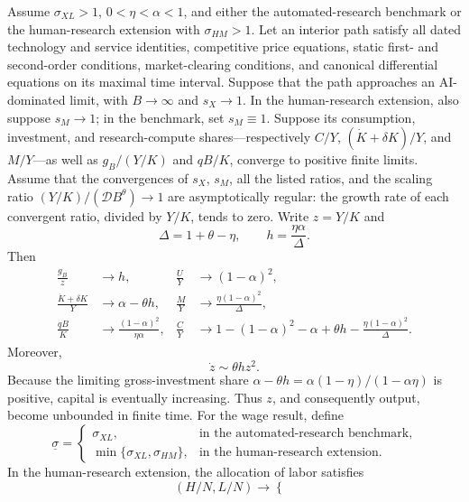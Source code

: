 \begin{conditionalresult}
\label{prop:axm-singular-limit}
Assume \(\sigma_{XL}>1\), \(0<\eta<\alpha<1\), and either the
automated-research benchmark or the human-research extension with
\(\sigma_{HM}>1\). Let an interior path satisfy all dated technology and service
identities, competitive price equations, static first- and second-order
conditions, market-clearing conditions, and canonical differential equations
on its maximal time interval. Suppose that the path approaches an AI-dominated
limit, with \(B\to\infty\) and \(s_X\to1\). In the human-research extension,
also suppose \(s_M\to1\); in the benchmark, set \(s_M\equiv1\). Suppose its
consumption, investment, and research-compute
shares---respectively \(C/Y\),
\((\dot K+\delta K)/Y\), and \(M/Y\)---as well as \(g_B/(Y/K)\) and \(qB/K\),
converge to positive finite limits.
Assume that the convergences of \(s_X\), \(s_M\), all the listed ratios, and the scaling ratio
\((Y/K)/(\mathcal D B^\theta)\to1\) are asymptotically regular: the growth rate
of each convergent ratio, divided by \(Y/K\), tends to zero. Write \(z=Y/K\) and
\[
 \Delta=1+\theta-\eta,\qquad
 h=\frac{\eta\alpha}{\Delta}.
\]
Then
\begin{align}
 \frac{g_B}{z}&\to h,&
 \frac{U}{Y}&\to(1-\alpha)^2,\\
 \frac{\dot K+\delta K}{Y}&\to\alpha-\theta h,&
 \frac{M}{Y}&\to\frac{\eta(1-\alpha)^2}{\Delta},\\
 \frac{qB}{K}&\to\frac{(1-\alpha)^2}{\eta\alpha},&
 \frac{C}{Y}&\to
 1-(1-\alpha)^2-\alpha+\theta h
 -\frac{\eta(1-\alpha)^2}{\Delta}.
 \label{eq:axm-singular-ratios}
\end{align}
Moreover,
\begin{equation}
 \dot z\sim\theta h z^2.
 \label{eq:axm-z-law}
\end{equation}
Because the limiting gross-investment share
\(\alpha-\theta h=\alpha(1-\eta)/(1-\alpha\eta)\) is positive, capital is
eventually increasing. Thus \(z\), and consequently output, become unbounded in
finite time.
For the wage result, define
\[
 \underline\sigma=
 \begin{cases}
  \sigma_{XL},&\text{in the automated-research benchmark},\\
  \min\{\sigma_{XL},\sigma_{HM}\},&\text{in the human-research extension}.
 \end{cases}
\]
In the human-research extension, the allocation of labor satisfies
\begin{equation}
 (H/N,L/N)\to
 \begin{cases}

\end{cases}
\end{equation}
\end{conditionalresult}
